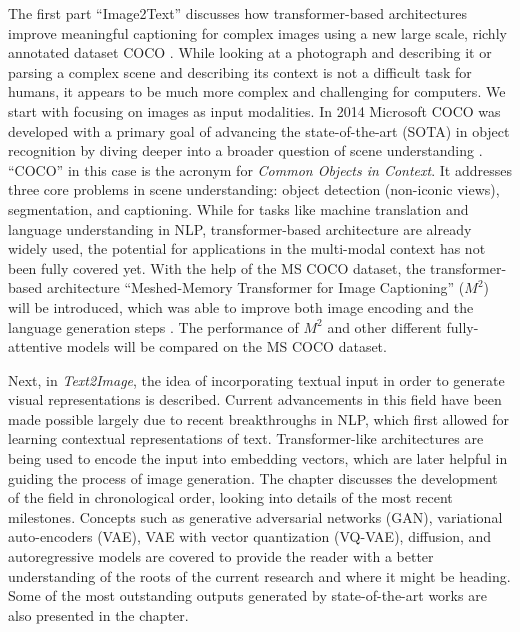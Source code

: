 \documentclass[
]{krantz}
\begin{document}
The first part ``Image2Text'' discusses how transformer-based architectures improve meaningful captioning for complex images using a new large scale, richly annotated dataset COCO \citep{mccoco, cornia2020m2}.
While looking at a photograph and describing it or parsing a complex scene and describing its context is not a difficult task for humans, it appears to be much more complex and challenging for computers.
We start with focusing on images as input modalities.
In 2014 Microsoft COCO was developed with a primary goal of advancing the state-of-the-art (SOTA) in object recognition by diving deeper into a broader question of scene understanding \citep{mccoco}.
``COCO'' in this case is the acronym for \emph{Common Objects in Context}.
It addresses three core problems in scene understanding: object detection (non-iconic views), segmentation, and captioning.
While for tasks like machine translation and language understanding in NLP, transformer-based architecture are already widely used, the potential for applications in the multi-modal context has not been fully covered yet.
With the help of the MS COCO dataset, the transformer-based architecture ``Meshed-Memory Transformer for Image Captioning'' (\(M^2\)) will be introduced, which was able to improve both image encoding and the language generation steps \citep{cornia2020m2}.
The performance of \(M^2\) and other different fully-attentive models will be compared on the MS COCO dataset.

Next, in \emph{Text2Image}, the idea of incorporating textual input in order to generate visual representations is described. Current advancements in this field have been made possible largely due to recent breakthroughs in NLP, which first allowed for learning contextual representations of text. Transformer-like architectures are being used to encode the input into embedding vectors, which are later helpful in guiding the process of image generation. The chapter discusses the development of the field in chronological order, looking into details of the most recent milestones. Concepts such as generative adversarial networks (GAN), variational auto-encoders (VAE), VAE with vector quantization (VQ-VAE), diffusion, and autoregressive models are covered to provide the reader with a better understanding of the roots of the current research and where it might be heading. Some of the most outstanding outputs generated by state-of-the-art works are also presented in the chapter.
\end{document}
